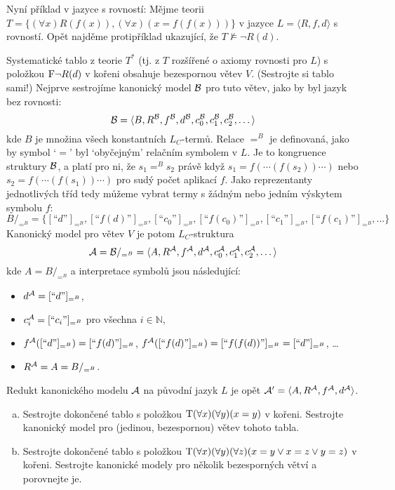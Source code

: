 \begin{example}
    Nyní příklad v jazyce s rovností: Mějme teorii $T=\{(\forall x)R(f(x)),(\forall x)(x=f(f(x)))\}$ v jazyce $L=\langle R,f,d \rangle$ s rovností. Opět najděme protipříklad ukazující, že $T\not\models\neg R(d)$. 

    Systematické tablo z teorie $T^*$ (tj. z $T$ rozšířené o axiomy rovnosti pro $L$) s položkou $\mathrm{F}\neg R(d)$ v kořeni obsahuje bezespornou větev $V$. (Sestrojte si tablo sami!) Nejprve sestrojíme kanonický model $\mathcal{B}$ pro tuto větev, jako by byl jazyk bez rovnosti:
    $$
    \mathcal{B}=\langle B,R^{\mathcal{B}},f^{\mathcal{B}},d^{\mathcal{B}},c_0^{\mathcal{B}},c_1^{\mathcal{B}},c_2^{\mathcal{B}},\dots\rangle
    $$
    kde $B$ je množina všech konstantních $L_C$-termů. Relace $=^B$ je definovaná, jako by symbol `$=$' byl `obyčejným' relačním symbolem v $L$. Je to kongruence struktury $\mathcal{B}$, a platí pro ni, že $s_1=^B s_2$ právě když $s_1=f(\cdots (f(s_2))\cdots)$ nebo $s_2=f(\cdots (f(s_1))\cdots)$ pro sudý počet aplikací $f$. Jako reprezentanty jednotlivých tříd tedy můžeme vybrat termy s žádným nebo jedním výskytem symbolu $f$:
    $$
        B/_{=^B} = \{[\text{``$d$''}]_{=^B},[\text{``$f(d)$''}]_{=^B},[\text{``$c_0$''}]_{=^B},[\text{``$f(c_0)$''}]_{=^B},[\text{``$c_1$''}]_{=^B},[\text{``$f(c_1)$''}]_{=^B},\dots\}
    $$
    Kanonický model pro větev $V$ je potom $L_C$-struktura 
    $$
    \mathcal{A}=\mathcal{B}/_{=^B}=\langle A,R^{\mathcal{A}},f^{\mathcal{A}},d^{\mathcal{A}},c_0^{\mathcal{A}},c_1^{\mathcal{A}},c_2^{\mathcal{A}},\dots\rangle
    $$
    kde $A=B/_{=^B}$ a interpretace symbolů jsou následující:
    \begin{itemize}
        \item $d^{\mathcal{A}}=[\text{``$d$''}]_{=^B}$,
        \item $c^{\mathcal{A}}_i=[\text{``$c_i$''}]_{=^B}$ pro všechna $i\in \mathbb N$,
        \item $f^{\mathcal{A}}([\text{``$d$''}]_{=^B})=[\text{``$f(d)$''}]_{=^B}$, $f^{\mathcal{A}}([\text{``$f(d)$''}]_{=^B})=[\text{``$f(f(d))$''}]_{=^B}=[\text{``$d$''}]_{=^B}$, \dots
        \item $R^{\mathcal{A}}=A=B/_{=^B}$.
    \end{itemize}
    Redukt kanonického modelu $\mathcal{A}$ na původní jazyk $L$ je opět $\mathcal{A}'=\langle A, R^{\mathcal{A}}, f^{\mathcal{A}}, d^{\mathcal{A}}\rangle$.
\end{example}

\begin{exercise}
    \begin{enumerate}[(a)]
        \item Sestrojte dokončené tablo s položkou $\mathrm{T} (\forall x)(\forall y)(x=y)$ v kořeni. Sestrojte kanonický model pro (jedinou, bezespornou) větev tohoto tabla.
        \item Sestrojte dokončené tablo s položkou $\mathrm{T} (\forall x)(\forall y)(\forall z)(x=y\lor x=z \lor y=z)$ v kořeni. Sestrojte kanonické modely pro několik bezesporných větví a porovnejte je.
    \end{enumerate}
\end{exercise} 

